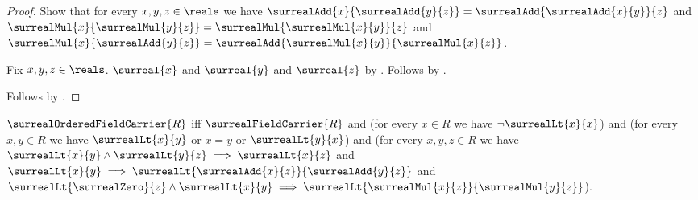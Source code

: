 \begin{proof}
    Show that for every $x,y,z\in\reals$ we have
        $\surrealAdd{x}{\surrealAdd{y}{z}}
            =\surrealAdd{\surrealAdd{x}{y}}{z}$ and
        $\surrealMul{x}{\surrealMul{y}{z}}
            =\surrealMul{\surrealMul{x}{y}}{z}$ and
        $\surrealMul{x}{\surrealAdd{y}{z}}
            =\surrealAdd{\surrealMul{x}{y}}{\surrealMul{x}{z}}$.
    \begin{subproof}
        Fix $x,y,z\in\reals$.
        $\surreal{x}$ and $\surreal{y}$ and $\surreal{z}$
            by .
        Follows by
            .
    \end{subproof}
    Follows by .
\end{proof}

\begin{definition}\label{surreal_ordered_field_carrier}
    $\surrealOrderedFieldCarrier{R}$ iff
        $\surrealFieldCarrier{R}$ and
        (for every $x\in R$ we have $\lnot\surrealLt{x}{x}$) and
        (for every $x,y\in R$ we have
            $\surrealLt{x}{y}$ or $x=y$ or $\surrealLt{y}{x}$) and
        (for every $x,y,z\in R$ we have
            $\surrealLt{x}{y}\land\surrealLt{y}{z}
                \implies\surrealLt{x}{z}$ and
            $\surrealLt{x}{y}\implies
                \surrealLt{\surrealAdd{x}{z}}{\surrealAdd{y}{z}}$ and
            $\surrealLt{\surrealZero}{z}\land\surrealLt{x}{y}
                \implies
                \surrealLt{\surrealMul{x}{z}}{\surrealMul{y}{z}}$).
\end{definition}

